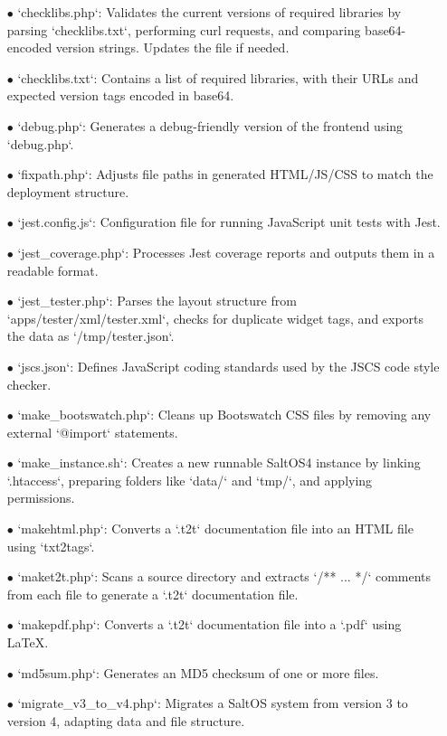\documentclass[a4paper]{article}
\begin{document}
\begin{itemize}
\item[\color{myblue}$\bullet$] `checklibs.php`: Validates the current versions of required libraries by parsing `checklibs.txt`, performing curl requests, and comparing base64-encoded version strings. Updates the file if needed.
\item[\color{myblue}$\bullet$] `checklibs.txt`: Contains a list of required libraries, with their URLs and expected version tags encoded in base64.
\item[\color{myblue}$\bullet$] `debug.php`: Generates a debug-friendly version of the frontend using `debug.php`.
\item[\color{myblue}$\bullet$] `fixpath.php`: Adjusts file paths in generated HTML/JS/CSS to match the deployment structure.
\item[\color{myblue}$\bullet$] `jest.config.js`: Configuration file for running JavaScript unit tests with Jest.
\item[\color{myblue}$\bullet$] `jest\_coverage.php`: Processes Jest coverage reports and outputs them in a readable format.
\item[\color{myblue}$\bullet$] `jest\_tester.php`: Parses the layout structure from `apps/tester/xml/tester.xml`, checks for duplicate widget tags, and exports the data as `/tmp/tester.json`.
\item[\color{myblue}$\bullet$] `jscs.json`: Defines JavaScript coding standards used by the JSCS code style checker.
\item[\color{myblue}$\bullet$] `make\_bootswatch.php`: Cleans up Bootswatch CSS files by removing any external `@import` statements.
\item[\color{myblue}$\bullet$] `make\_instance.sh`: Creates a new runnable SaltOS4 instance by linking `.htaccess`, preparing folders like `data/` and `tmp/`, and applying permissions.
\item[\color{myblue}$\bullet$] `makehtml.php`: Converts a `.t2t` documentation file into an HTML file using `txt2tags`.
\item[\color{myblue}$\bullet$] `maket2t.php`: Scans a source directory and extracts `/** ... */` comments from each file to generate a `.t2t` documentation file.
\item[\color{myblue}$\bullet$] `makepdf.php`: Converts a `.t2t` documentation file into a `.pdf` using LaTeX.
\item[\color{myblue}$\bullet$] `md5sum.php`: Generates an MD5 checksum of one or more files.
\item[\color{myblue}$\bullet$] `migrate\_v3\_to\_v4.php`: Migrates a SaltOS system from version 3 to version 4, adapting data and file structure.

\end{itemize}
\end{document}
